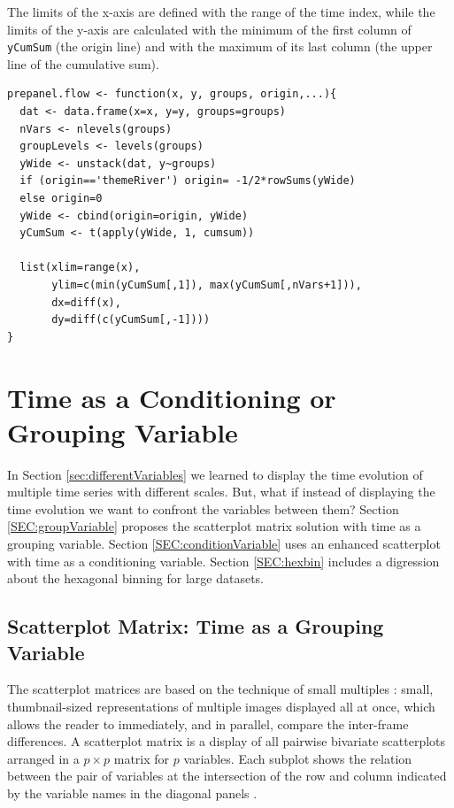 \documentclass[smallroyalvopaper]{memoir}
\begin{document}
The limits of the x-axis are defined with the range of the time index,
while the limits of the y-axis are calculated with the minimum of the
first column of \texttt{yCumSum} (the origin line) and with the maximum of
its last column (the upper line of the cumulative sum).

\lstset{language=R,numbers=none}
\begin{lstlisting}
prepanel.flow <- function(x, y, groups, origin,...){
  dat <- data.frame(x=x, y=y, groups=groups)
  nVars <- nlevels(groups)
  groupLevels <- levels(groups)
  yWide <- unstack(dat, y~groups)
  if (origin=='themeRiver') origin= -1/2*rowSums(yWide)
  else origin=0
  yWide <- cbind(origin=origin, yWide)
  yCumSum <- t(apply(yWide, 1, cumsum))

  list(xlim=range(x),
       ylim=c(min(yCumSum[,1]), max(yCumSum[,nVars+1])),
       dx=diff(x),
       dy=diff(c(yCumSum[,-1])))
}
\end{lstlisting}

\chapter{Time as a Conditioning or Grouping Variable}
\label{sec:orgheadline20}
\label{cha:timeGroupFactor}

In Section \ref{sec:differentVariables} we learned to display the time evolution of multiple time series with different scales. But, what if instead of displaying the time evolution we want to confront the variables between them? Section \ref{SEC:groupVariable} proposes the scatterplot matrix solution with time as a grouping variable. Section \ref{SEC:conditionVariable} uses an enhanced scatterplot with time as a conditioning variable. Section \ref{SEC:hexbin} includes a digression about the hexagonal binning for large datasets.

\section{Scatterplot Matrix: Time as a Grouping Variable}
\label{sec:orgheadline2}
\label{orgtarget1}

The scatterplot matrices are based on the technique of small multiples
\cite{Tufte1990}: small, thumbnail-sized representations of multiple
images displayed all at once, which allows the reader to immediately,
and in parallel, compare the inter-frame differences.  A scatterplot
matrix is a display of all pairwise bivariate scatterplots arranged in
a \(p \times p\) matrix for \(p\) variables. Each subplot shows the
relation between the pair of variables at the intersection of the row
and column indicated by the variable names in the diagonal panels
\cite{Friendly.Denis2005}.
\end{document}
